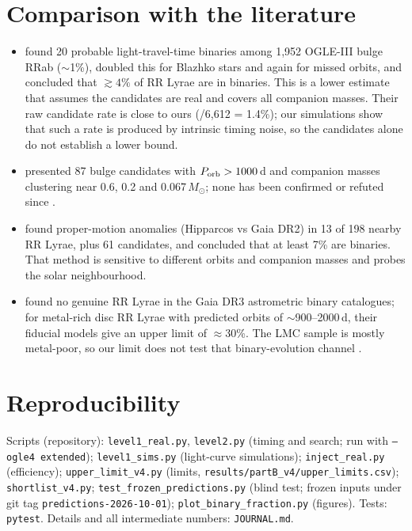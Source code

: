 \documentclass[11pt]{article}
\newcommand{\Msun}{\ensuremath{M_\odot}}
\begin{document}
\section{Comparison with the literature}\label{sec:literature}
\begin{itemize}[leftmargin=*]
\item \citet{Hajdu2015} found 20 probable light-travel-time binaries among 1{,}952 OGLE-III bulge RRab ($\sim$1\%), doubled
this for Blazhko stars and again for missed orbits, and concluded that $\gtrsim4\%$ of RR Lyrae are in binaries. This is a lower
estimate that assumes the candidates are real and covers all companion masses. Their raw candidate rate is close to ours
(\NCAND/6{,}612 = 1.4\%); our simulations show that such a rate is produced by intrinsic timing noise, so the candidates alone do
not establish a lower bound.
\item \citet{Hajdu2021} presented 87 bulge candidates with $P_{\rm orb}>1000$\,d and companion masses clustering near 0.6, 0.2 and
0.067\,\Msun; none has been confirmed or refuted since \citep{Salinas2026}.
\item \citet{Kervella2019} found proper-motion anomalies (Hipparcos vs Gaia DR2) in 13 of 198 nearby RR Lyrae, plus 61
candidates, and concluded that at least 7\% are binaries. That method is sensitive to different orbits and companion masses and
probes the solar neighbourhood.
\item \citet{Iorio2026} found no genuine RR Lyrae in the Gaia DR3 astrometric binary catalogues; for metal-rich disc RR Lyrae with
predicted orbits of $\sim$900--2000\,d, their fiducial models give an upper limit of $\approx$30\%. The LMC sample is mostly
metal-poor, so our limit does not test that binary-evolution channel \citep{Bobrick2024}.
\end{itemize}

\section{Reproducibility}\label{sec:repro}
Scripts (repository): \texttt{level1\_real.py}, \texttt{level2.py} (timing and search; run with \texttt{--ogle4 extended});
\texttt{level1\_sims.py} (light-curve simulations); \texttt{inject\_real.py} (efficiency); \texttt{upper\_limit\_v4.py} (limits,
\texttt{results/partB\_v4/upper\_limits.csv}); \texttt{shortlist\_v4.py}; \texttt{test\_frozen\_predictions.py} (blind test; frozen
inputs under git tag \texttt{predictions-2026-10-01}); \texttt{plot\_binary\_fraction.py} (figures). Tests: \texttt{pytest}.
Details and all intermediate numbers: \texttt{JOURNAL.md}.
\end{document}
